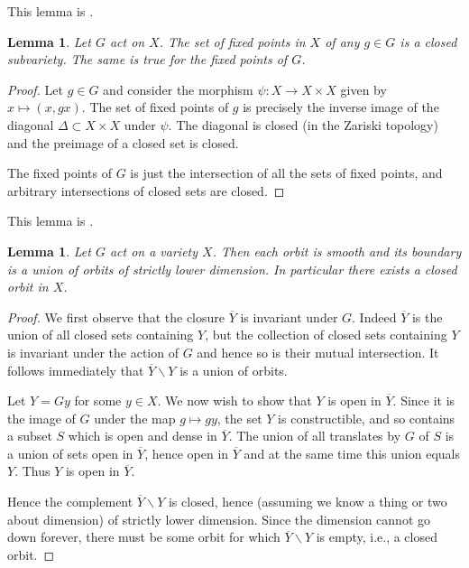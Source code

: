 \documentclass[12pt]{article}
\theoremstyle{plain}
\newtheorem{lemma}[thm]{Lemma}
\theoremstyle{definition}
\numberwithin{equation}{section}
\newcommand{\ov}[1]{\overline#1}
\newcommand{\D}{\Delta}
\begin{document}
This lemma is {\cite[8.2]{Humphreys.alg.grp}}.
\begin{lemma}\label{lem:fixed.points.closed}
Let $G$ act on $X$. The set of fixed points in $X$ of any $g \in G$ is a closed subvariety. The same is true for the fixed points of $G$.
\end{lemma}

\begin{proof}
Let $g \in G$ and consider the morphism $\psi : X \rightarrow X \times X$ given by $x \mapsto (x, gx)$. The set of fixed points of $g$ is precisely the inverse image of the diagonal $\D \subset X \times X$ under $\psi$. The diagonal is closed (in the Zariski topology) and the preimage of a closed set is closed.

The fixed points of $G$ is just the intersection of all the sets of fixed points, and arbitrary intersections of closed sets are closed.
\end{proof}

This lemma is {\cite[8.3]{Humphreys.alg.grp}}.
\begin{lemma}\label{lem:closed.orbit}
Let $G$ act on a variety $X$. Then each orbit is smooth and its boundary is a union of orbits of strictly lower dimension. In particular there exists a closed orbit in $X$.
\end{lemma}

\begin{proof}
We first observe that the closure $\ov Y$ is invariant under $G$. Indeed $\ov Y$ is the union of all closed sets containing $Y$, but the collection of closed sets containing $Y$ is invariant under the action of $G$ and hence so is their mutual intersection. It follows immediately that $\ov Y \backslash Y$ is a union of orbits.

Let $Y = Gy$ for some $y \in X$. We now wish to show that $Y$ is open in $\ov{Y}$. Since it is the image of $G$ under the map $g \mapsto gy$, the set $Y$ is constructible, and so contains a subset $S$ which is open and dense in $\ov{Y}$. The union of all translates by $G$ of $S$ is a union of sets open in $\ov Y$, hence open in $\ov Y$ and at the same time this union equals $Y$. Thus $Y$ is open in $\ov Y$.

Hence the complement $\ov Y \backslash Y$ is closed, hence (assuming we know a thing or two about dimension) of strictly lower dimension. Since the dimension cannot go down forever, there must be some orbit for which $\ov Y \backslash Y$ is empty, i.e., a closed orbit.
\end{proof}
\end{document}
